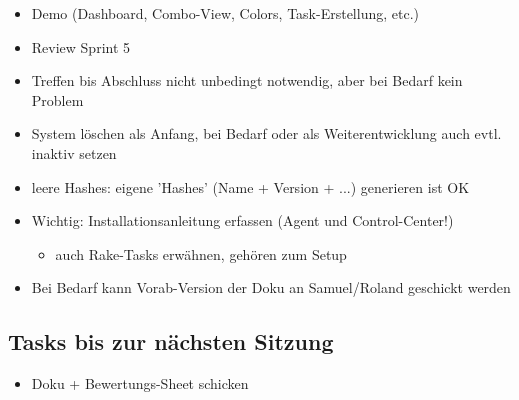 \documentclass[class=scrbook,crop=false]{standalone}
\begin{document}
	\begin{itemize}
        \item Demo (Dashboard, Combo-View, Colors, Task-Erstellung, etc.)
        \item Review Sprint 5
        \item Treffen bis Abschluss nicht unbedingt notwendig, aber bei Bedarf kein Problem
        \item System löschen als Anfang, bei Bedarf oder als Weiterentwicklung auch evtl. inaktiv setzen
        \item leere Hashes: eigene 'Hashes' (Name + Version + ...) generieren ist OK
        \item Wichtig: Installationsanleitung erfassen (Agent und Control-Center!)
        \begin{itemize}
            \item auch Rake-Tasks erwähnen, gehören zum Setup
        \end{itemize}
        \item Bei Bedarf kann Vorab-Version der Doku an Samuel/Roland geschickt werden
    \end{itemize}
    
    \subsection*{Tasks bis zur nächsten Sitzung}
    
    \begin{itemize}
        \item Doku + Bewertungs-Sheet schicken
    \end{itemize}
\end{document}
